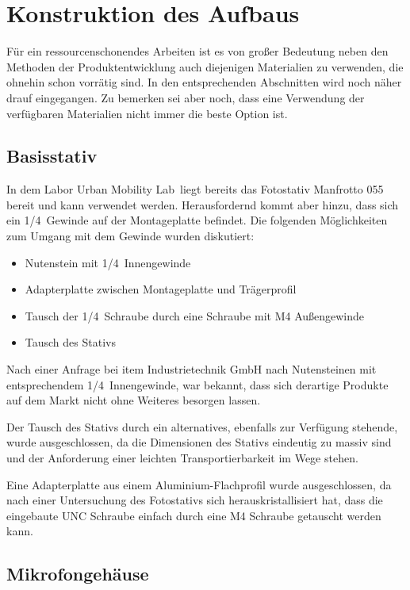 \section{Konstruktion des Aufbaus}

Für ein ressourcenschonendes Arbeiten ist es von großer Bedeutung neben den Methoden der Produktentwicklung auch diejenigen Materialien zu verwenden, die ohnehin schon vorrätig sind. In den entsprechenden Abschnitten wird noch näher drauf eingegangen. Zu bemerken sei aber noch, dass eine Verwendung der verfügbaren Materialien nicht immer die beste Option ist.

\subsection{Basisstativ}

In dem Labor \glqq Urban Mobility Lab\grqq\ liegt bereits das Fotostativ Manfrotto 055 bereit und kann verwendet werden. Herausfordernd kommt aber hinzu, dass sich ein 1/4\grqq\ Gewinde auf der Montageplatte befindet. Die folgenden Möglichkeiten zum Umgang mit dem Gewinde wurden diskutiert:

\begin{itemize}
	\item Nutenstein mit 1/4\grqq\ Innengewinde
	\item Adapterplatte zwischen Montageplatte und Trägerprofil
	\item Tausch der 1/4\grqq\ Schraube durch eine Schraube mit M4 Außengewinde
	\item Tausch des Stativs
\end{itemize}

Nach einer Anfrage bei item Industrietechnik GmbH nach Nutensteinen mit entsprechendem 1/4\grqq\ Innengewinde, war bekannt, dass sich derartige Produkte auf dem Markt nicht ohne Weiteres besorgen lassen.

Der Tausch des Stativs durch ein alternatives, ebenfalls zur Verfügung stehende, wurde ausgeschlossen, da die Dimensionen des Stativs eindeutig zu massiv sind und der Anforderung einer leichten Transportierbarkeit im Wege stehen.

Eine Adapterplatte aus einem Aluminium-Flachprofil wurde ausgeschlossen, da nach einer Untersuchung des Fotostativs sich herauskristallisiert hat, dass die eingebaute UNC Schraube einfach durch eine M4 Schraube getauscht werden kann.

\subsection{Mikrofongehäuse}

